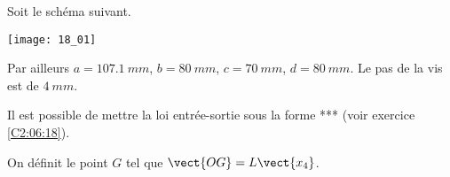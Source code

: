 \normalfalse \difficilefalse \tdifficiletrue
\correctionfalse


\setcounter{question}{0}
\ifcorrection
\else
{}
\fi

\ifprof
\else

Soit le schéma suivant. 
\begin{marginfigure}
\texttt{[image: 18\_01]}
\end{marginfigure}
\fi

Par ailleurs $a=\SI{107,1}{mm}$, $b=\SI{80}{mm}$, $c=\SI{70}{mm}$, $d=\SI{80}{mm}$. Le pas de la vis est de $\SI{4}{mm}$.


Il est possible de mettre la loi entrée-sortie sous la forme *** (voir exercice \ref{C2:06:18}).

On définit le point $G$ tel que $\vect{OG}=L\vect{x_4}$.

\ifprof
\else
\fi

\ifprof
\else
\fi


\ifprof
\else


\fi